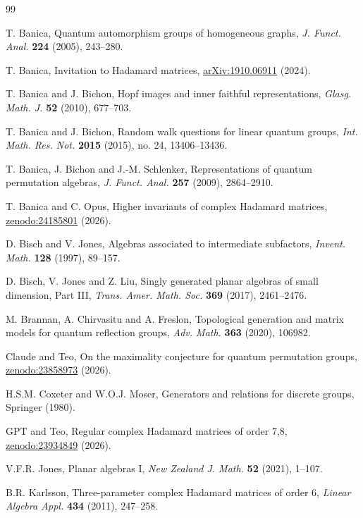 \documentclass[11pt,a4paper]{amsart}
\newcommand{\arx}[1]{\href{https://arxiv.org/pdf/#1}{arXiv:#1}}
\begin{document}
{\hypersetup{allcolors=black}
\begin{thebibliography}{99}

 T. Banica, Quantum automorphism groups of homogeneous graphs, {\em J. Funct. Anal.} {\bf 224} (2005), 243--280.

 T. Banica, Invitation to Hadamard matrices, \arx{1910.06911} (2024).

 T. Banica and J. Bichon, Hopf images and inner faithful representations, {\em Glasg. Math. J.} {\bf 52} (2010), 677--703.

 T. Banica and J. Bichon, Random walk questions for linear quantum groups, {\em Int. Math. Res. Not.} {\bf 2015} (2015), no. 24, 13406--13436.

 T. Banica, J. Bichon and J.-M. Schlenker, Representations of quantum permutation algebras, {\em J. Funct. Anal.} {\bf 257} (2009), 2864--2910.

 T. Banica and C. Opus, Higher invariants of complex Hadamard matrices, \href{https://zenodo.org/records/24185801}{zenodo:24185801} (2026).

 D. Bisch and V. Jones, Algebras associated to intermediate subfactors, {\em Invent. Math.} {\bf 128} (1997), 89--157.

 D. Bisch, V. Jones and Z. Liu, Singly generated planar algebras of small dimension, Part III, {\em Trans. Amer. Math. Soc.} {\bf 369} (2017), 2461--2476.

 M. Brannan, A. Chirvasitu and A. Freslon, Topological generation and matrix models for quantum reflection groups, {\em Adv. Math.} {\bf 363} (2020), 106982.

 Claude and Teo, On the maximality conjecture for quantum permutation groups, \href{https://zenodo.org/records/23858973}{zenodo:23858973} (2026).

 H.S.M. Coxeter and W.O.J. Moser, Generators and relations for discrete groups, Springer (1980).

 GPT and Teo, Regular complex Hadamard matrices of order 7,8, \href{https://zenodo.org/records/23934849}{zenodo:23934849} (2026).

 V.F.R. Jones, Planar algebras I, {\em New Zealand J. Math.} {\bf 52} (2021), 1--107.

 B.R. Karlsson, Three-parameter complex Hadamard matrices of order 6, {\em Linear Algebra Appl.} {\bf 434} (2011), 247--258.


\end{thebibliography}}
\end{document}
